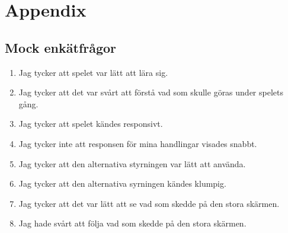 \documentclass[10pt]{article}
\begin{document}
	
\pagebreak
\section{Appendix}
	\subsection*{Mock enkätfrågor}
	\begin{enumerate}
		\item Jag tycker att spelet var lätt att lära sig. 
		\item Jag tycker att det var svårt att förstå vad som skulle göras under spelets gång.
		\item Jag tycker att spelet kändes responsivt.
		\item Jag tycker inte att responsen för mina handlingar visades snabbt.
		\item Jag tycker att den alternativa styrningen var lätt att använda.
		\item Jag tycker att den alternativa syrningen kändes klumpig.
		\item Jag tycker att det var lätt att se vad som skedde på den stora skärmen.
		\item Jag hade svårt att följa vad som skedde på den stora skärmen.
		
	\end{enumerate}

	
\pagebreak

\printbibliography
{}
\end{document}
